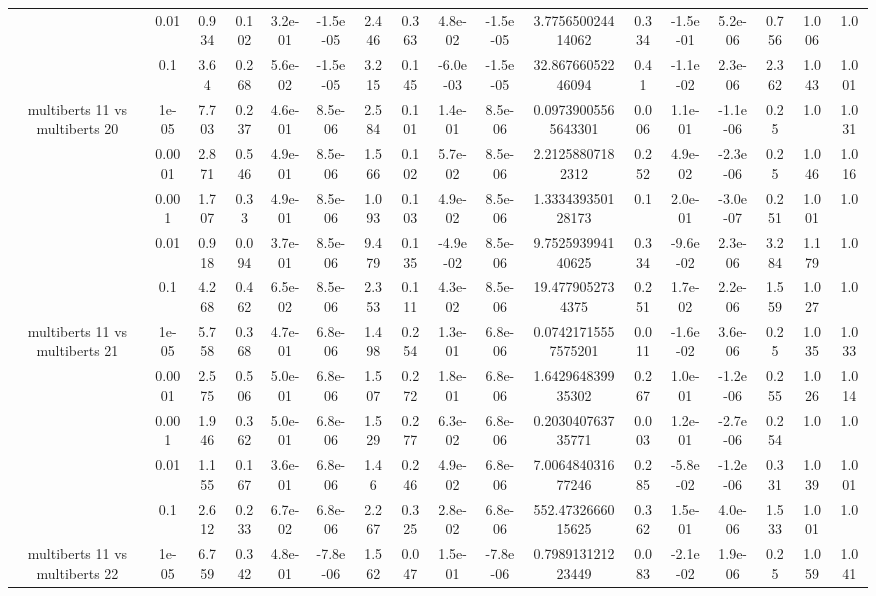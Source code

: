 \begin{tabular}{|c|c|c|c|c|c|c|c|c|c|c|c|c|c|c|c|c|}
 & 0.01 & 0.934 & 0.102 & 3.2e-01 & -1.5e-05 & 2.446 & 0.363 & 4.8e-02 & -1.5e-05 & 3.775650024414062 & 0.334 & -1.5e-01 & 5.2e-06 & 0.756 & 1.006 & 1.0 \\
 & 0.1 & 3.64 & 0.268 & 5.6e-02 & -1.5e-05 & 3.215 & 0.145 & -6.0e-03 & -1.5e-05 & 32.86766052246094 & 0.41 & -1.1e-02 & 2.3e-06 & 2.362 & 1.043 & 1.001 \\
\hline
\multirow{5}{*}{multiberts 11 vs multiberts 20} & 1e-05 & 7.703 & 0.237 & 4.6e-01 & 8.5e-06 & 2.584 & 0.101 & 1.4e-01 & 8.5e-06 & 0.09739005565643301 & 0.006 & 1.1e-01 & -1.1e-06 & 0.25 & 1.0 & 1.031 \\
 & 0.0001 & 2.871 & 0.546 & 4.9e-01 & 8.5e-06 & 1.566 & 0.102 & 5.7e-02 & 8.5e-06 & 2.21258807182312 & 0.252 & 4.9e-02 & -2.3e-06 & 0.25 & 1.046 & 1.016 \\
 & 0.001 & 1.707 & 0.33 & 4.9e-01 & 8.5e-06 & 1.093 & 0.103 & 4.9e-02 & 8.5e-06 & 1.333439350128173 & 0.1 & 2.0e-01 & -3.0e-07 & 0.251 & 1.001 & 1.0 \\
 & 0.01 & 0.918 & 0.094 & 3.7e-01 & 8.5e-06 & 9.479 & 0.135 & -4.9e-02 & 8.5e-06 & 9.752593994140625 & 0.334 & -9.6e-02 & 2.3e-06 & 3.284 & 1.179 & 1.0 \\
 & 0.1 & 4.268 & 0.462 & 6.5e-02 & 8.5e-06 & 2.353 & 0.111 & 4.3e-02 & 8.5e-06 & 19.4779052734375 & 0.251 & 1.7e-02 & 2.2e-06 & 1.559 & 1.027 & 1.0 \\
\hline
\multirow{5}{*}{multiberts 11 vs multiberts 21} & 1e-05 & 5.758 & 0.368 & 4.7e-01 & 6.8e-06 & 1.498 & 0.254 & 1.3e-01 & 6.8e-06 & 0.07421715557575201 & 0.011 & -1.6e-02 & 3.6e-06 & 0.25 & 1.035 & 1.033 \\
 & 0.0001 & 2.575 & 0.506 & 5.0e-01 & 6.8e-06 & 1.507 & 0.272 & 1.8e-01 & 6.8e-06 & 1.642964839935302 & 0.267 & 1.0e-01 & -1.2e-06 & 0.255 & 1.026 & 1.014 \\
 & 0.001 & 1.946 & 0.362 & 5.0e-01 & 6.8e-06 & 1.529 & 0.277 & 6.3e-02 & 6.8e-06 & 0.203040763735771 & 0.003 & 1.2e-01 & -2.7e-06 & 0.254 & 1.0 & 1.0 \\
 & 0.01 & 1.155 & 0.167 & 3.6e-01 & 6.8e-06 & 1.46 & 0.246 & 4.9e-02 & 6.8e-06 & 7.006484031677246 & 0.285 & -5.8e-02 & -1.2e-06 & 0.331 & 1.039 & 1.001 \\
 & 0.1 & 2.612 & 0.233 & 6.7e-02 & 6.8e-06 & 2.267 & 0.325 & 2.8e-02 & 6.8e-06 & 552.4732666015625 & 0.362 & 1.5e-01 & 4.0e-06 & 1.533 & 1.001 & 1.0 \\
\hline
\multirow{5}{*}{multiberts 11 vs multiberts 22} & 1e-05 & 6.759 & 0.342 & 4.8e-01 & -7.8e-06 & 1.562 & 0.047 & 1.5e-01 & -7.8e-06 & 0.798913121223449 & 0.083 & -2.1e-02 & 1.9e-06 & 0.25 & 1.059 & 1.041 \\

\end{tabular}
